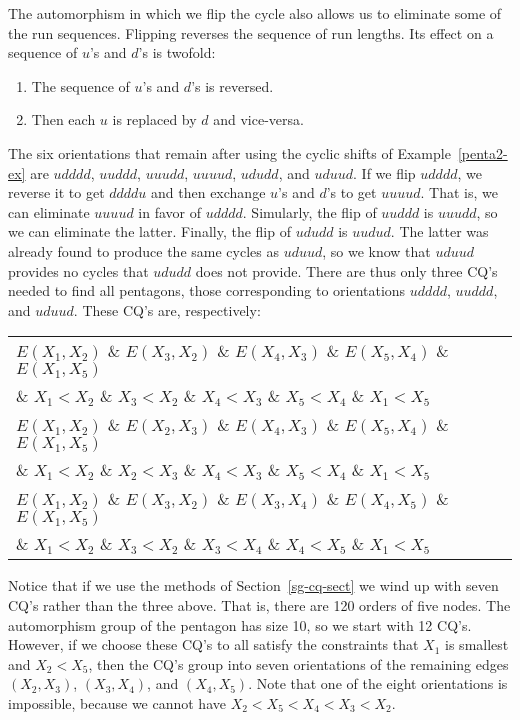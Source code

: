 The automorphism in which we flip the cycle also allows us to eliminate some of the run sequences.  Flipping reverses the sequence of run lengths.  Its effect on a sequence of $u$'s and $d$'s is twofold:

\begin{enumerate}

\item
The sequence of $u$'s and $d$'s is reversed.

\item
Then each $u$ is replaced by $d$ and vice-versa.

\end{enumerate}

\begin{example}
\label{penta3-ex}
The six orientations that remain after using the cyclic shifts of Example~\ref{penta2-ex} are $udddd$, $uuddd$, $uuudd$, $uuuud$, $ududd$, and $uduud$.
If we flip $udddd$, we reverse it to get $ddddu$ and then exchange $u$'s and $d$'s to get $uuuud$.  That is, we can eliminate $uuuud$ in favor of $udddd$.  Simularly, the flip of $uuddd$ is $uuudd$, so we can eliminate the latter.  Finally, the flip of $ududd$ is $uudud$.  The latter was already found to produce the same cycles as $uduud$, so we know that $uduud$ provides no cycles that $ududd$ does not provide.  There are thus only three CQ's needed to find all pentagons, those corresponding to orientations $udddd$, $uuddd$, and $uduud$.  These CQ's are, respectively:

\begin{center}
\begin{tabular}{l}
$E(X_1,X_2)$ \& $E(X_3,X_2)$ \& $E(X_4,X_3)$ \& $E(X_5,X_4)$ \& $E(X_1,X_5)$\\ \& $X_1<X_2$ \& $X_3<X_2$ \& $X_4<X_3$ \& $X_5<X_4$ \& $X_1<X_5$\\
$E(X_1,X_2)$ \& $E(X_2,X_3)$ \& $E(X_4,X_3)$ \& $E(X_5,X_4)$ \& $E(X_1,X_5)$\\ \& $X_1<X_2$ \& $X_2<X_3$ \& $X_4<X_3$ \& $X_5<X_4$ \& $X_1<X_5$\\
$E(X_1,X_2)$ \& $E(X_3,X_2)$ \& $E(X_3,X_4)$ \& $E(X_4,X_5)$ \& $E(X_1,X_5)$\\ \& $X_1<X_2$ \& $X_3<X_2$ \& $X_3<X_4$ \& $X_4<X_5$ \& $X_1<X_5$\\
\end{tabular}
\end{center}

Notice that if we use the methods of Section~\ref{sg-cq-sect} we wind up with seven CQ's rather than the three above.  That is, there are 120 orders of five nodes.  The automorphism group of the pentagon has size 10, so we start with 12 CQ's.  However, if we choose these CQ's to all satisfy the constraints that $X_1$ is smallest and $X_2<X_5$, then the CQ's group into seven orientations of the remaining edges $(X_2,X_3)$, $(X_3,X_4)$, and $(X_4,X_5)$.  Note that one of the eight orientations is impossible, because we cannot have $X_2<X_5<X_4<X_3<X_2$.
\end{example}

